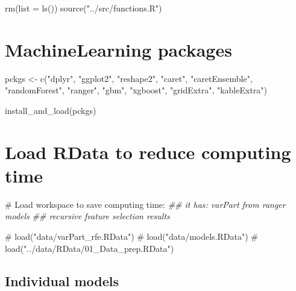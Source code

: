 \documentclass[
  letterpaper,
  DIV=11,
  numbers=noendperiod]{scrreprt}
\newenvironment{Shaded}{\begin{snugshade}}{\end{snugshade}}
\newcommand{\AttributeTok}[1]{\textcolor[rgb]{0.40,0.45,0.13}{#1}}
\newcommand{\CommentTok}[1]{\textcolor[rgb]{0.37,0.37,0.37}{#1}}
\newcommand{\DocumentationTok}[1]{\textcolor[rgb]{0.37,0.37,0.37}{\textit{#1}}}
\newcommand{\FunctionTok}[1]{\textcolor[rgb]{0.28,0.35,0.67}{#1}}
\newcommand{\NormalTok}[1]{\textcolor[rgb]{0.00,0.23,0.31}{#1}}
\newcommand{\OtherTok}[1]{\textcolor[rgb]{0.00,0.23,0.31}{#1}}
\newcommand{\StringTok}[1]{\textcolor[rgb]{0.13,0.47,0.30}{#1}}
\begin{document}
\begin{Shaded}
\begin{Highlighting}[]
\FunctionTok{rm}\NormalTok{(}\AttributeTok{list =} \FunctionTok{ls}\NormalTok{())}
\FunctionTok{source}\NormalTok{(}\StringTok{"../src/functions.R"}\NormalTok{)}
\end{Highlighting}
\end{Shaded}

\section{MachineLearning packages}

\begin{Shaded}
\begin{Highlighting}[]
\NormalTok{pckgs }\OtherTok{\textless{}{-}} \FunctionTok{c}\NormalTok{(}\StringTok{"dplyr"}\NormalTok{, }\StringTok{"ggplot2"}\NormalTok{, }\StringTok{"reshape2"}\NormalTok{, }
           \StringTok{"caret"}\NormalTok{, }\StringTok{"caretEnsemble"}\NormalTok{, }
           \StringTok{"randomForest"}\NormalTok{, }\StringTok{"ranger"}\NormalTok{, }\StringTok{"gbm"}\NormalTok{, }\StringTok{"xgboost"}\NormalTok{, }
           \StringTok{"gridExtra"}\NormalTok{, }\StringTok{"kableExtra"}\NormalTok{)}


\FunctionTok{install\_and\_load}\NormalTok{(pckgs)}
\end{Highlighting}
\end{Shaded}

\section{Load RData to reduce computing time}

\begin{Shaded}
\begin{Highlighting}[]
\CommentTok{\# Load workspace to save computing time:}
\DocumentationTok{\#\# it has: varPart from ranger models}
\DocumentationTok{\#\# recursive feature selection results}

\CommentTok{\# load("data/varPart\_rfe.RData")}
\CommentTok{\# load("data/models.RData")}
\CommentTok{\# load("../data/RData/01\_Data\_prep.RData")}
\end{Highlighting}
\end{Shaded}

\subsection{Individual models}\label{individual-models}
\end{document}
